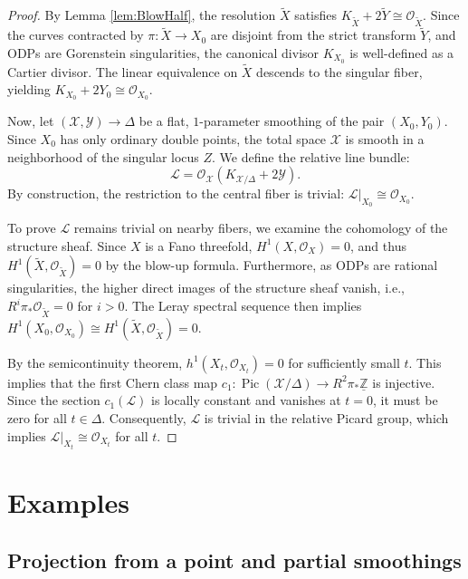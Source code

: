 \documentclass[11pt]{article}
\theoremstyle{definition}
\newcommand{\OO}{\mathcal{O}}
\newcommand{\Z}{\mathbb{Z}}
\DeclareMathOperator{\Pic}{Pic}
\begin{document}
\begin{proof}
By Lemma \ref{lem:BlowHalf}, the resolution $\tilde{X}$ satisfies $K_{\tilde{X}} + 2\tilde{Y} \cong \OO_{\tilde{X}}$. Since the curves contracted by $\pi: \tilde{X} \to X_0$ are disjoint from the strict transform $\tilde{Y}$, and ODPs are Gorenstein singularities, the canonical divisor $K_{X_0}$ is well-defined as a Cartier divisor. The linear equivalence on $\tilde{X}$ descends to the singular fiber, yielding $K_{X_0} + 2Y_0 \cong \OO_{X_0}$. 

Now, let $(\mathcal{X}, \mathcal{Y}) \to \Delta$ be a flat, $1$-parameter smoothing of the pair $(X_0, Y_0)$. Since $X_0$ has only ordinary double points, the total space $\mathcal{X}$ is smooth in a neighborhood of the singular locus $Z$. We define the relative line bundle:
\[ \mathcal{L} = \OO_{\mathcal{X}}(K_{\mathcal{X}/\Delta} + 2\mathcal{Y}). \]
By construction, the restriction to the central fiber is trivial: $\mathcal{L}|_{X_0} \cong \OO_{X_0}$. 

To prove $\mathcal{L}$ remains trivial on nearby fibers, we examine the cohomology of the structure sheaf. Since $X$ is a Fano threefold, $H^1(X, \OO_X) = 0$, and thus $H^1(\tilde{X}, \OO_{\tilde{X}}) = 0$ by the blow-up formula. Furthermore, as ODPs are rational singularities, the higher direct images of the structure sheaf vanish, i.e., $R^i\pi_* \OO_{\tilde{X}} = 0$ for $i > 0$. The Leray spectral sequence then implies $H^1(X_0, \OO_{X_0}) \cong H^1(\tilde{X}, \OO_{\tilde{X}}) = 0$.

By the semicontinuity theorem, $h^1(X_t, \OO_{X_t}) = 0$ for sufficiently small $t$. This implies that the first Chern class map $c_1: \Pic(\mathcal{X}/\Delta) \to R^2\pi_* \underline{\Z}$ is injective. Since the section $c_1(\mathcal{L})$ is locally constant and vanishes at $t=0$, it must be zero for all $t \in \Delta$. Consequently, $\mathcal{L}$ is trivial in the relative Picard group, which implies $\mathcal{L}|_{X_t} \cong \OO_{X_t}$ for all $t$.
\end{proof}




\section{Examples}\label{s:examples}
\subsection{Projection from a point and partial smoothings}
\end{document}
